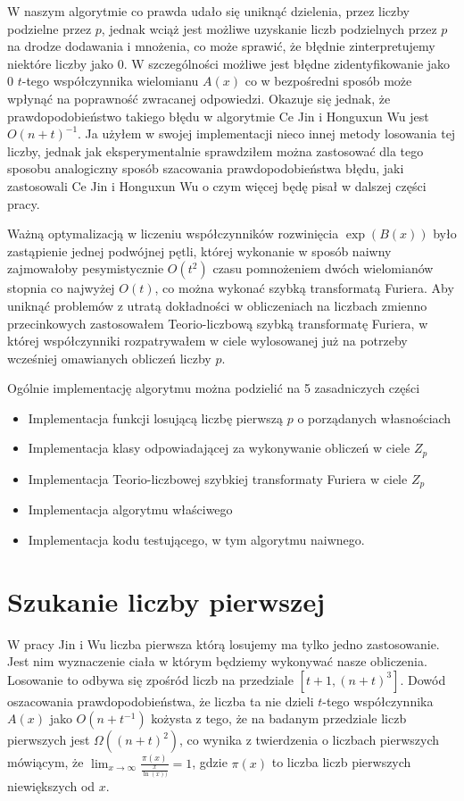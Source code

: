 \documentclass{article}
\begin{document}
W naszym algorytmie co prawda udało się uniknąć dzielenia, przez liczby podzielne przez $p$,
jednak wciąż jest możliwe uzyskanie liczb podzielnych przez $p$ na drodze dodawania i mnożenia, co może sprawić, że błędnie zinterpretujemy niektóre liczby jako $0$. W szczególności możliwe jest błędne zidentyfikowanie jako $0$ $t$-tego współczynnika wielomianu 
$A(x)$ co w bezpośredni sposób może wpłynąć na poprawność zwracanej odpowiedzi. Okazuje się
jednak, że prawdopodobieństwo takiego błędu w algorytmie Ce Jin i Honguxun Wu jest $O(n+t)^{-1}$. Ja użyłem w swojej implementacji nieco innej metody losowania tej liczby, jednak jak
eksperymentalnie sprawdziłem można zastosować dla tego sposobu analogiczny sposób szacowania prawdopodobieństwa błędu, jaki zastosowali Ce Jin i Honguxun Wu o czym więcej będę pisał w dalszej części pracy.

Ważną optymalizacją w liczeniu współczynników rozwinięcia $\exp(B(x))$ było zastąpienie jednej podwójnej pętli, której wykonanie w sposób naiwny zajmowałoby pesymistycznie $O(t^2)$ czasu pomnożeniem dwóch wielomianów stopnia co najwyżej $O(t)$, co można wykonać szybką 
transformatą Furiera. Aby uniknąć problemów z utratą dokładności w obliczeniach na liczbach 
zmienno przecinkowych zastosowałem Teorio-liczbową szybką transformatę Furiera, w której współczynniki rozpatrywałem w ciele wylosowanej już na potrzeby wcześniej omawianych obliczeń 
liczby $p$.

Ogólnie implementację algorytmu można podzielić na 5 zasadniczych części
\begin{itemize}
  \item Implementacja funkcji losującą liczbę pierwszą $p$ o porządanych własnościach
  \item Implementacja klasy odpowiadającej za wykonywanie obliczeń w ciele $Z_p$
  \item Implementacja Teorio-liczbowej szybkiej transformaty Furiera w ciele $Z_p$
  \item Implementacja algorytmu właściwego
  \item Implementacja kodu testującego, w tym algorytmu naiwnego.
\end{itemize}

\section{Szukanie liczby pierwszej}
W pracy Jin i Wu liczba pierwsza którą losujemy ma tylko jedno zastosowanie. Jest nim
wyznaczenie ciała w którym będziemy wykonywać nasze obliczenia. Losowanie to odbywa się 
zpośród liczb na przedziale $[t+1,(n+t)^3]$. Dowód oszacowania prawdopodobieństwa, 
że liczba ta nie dzieli $t$-tego współczynnika $A(x)$ jako $O(n+t^{-1})$ kożysta z tego, że
na badanym przedziale liczb pierwszych jest $\Omega((n+t)^2)$, co wynika z twierdzenia o 
liczbach pierwszych mówiącym, że $\lim_{x \to \infty} \frac{\pi(x)}{\frac{x}{\ln(x))}}=1$, gdzie $\pi(x)$ to liczba liczb pierwszych niewiększych od $x$.
\end{document}
